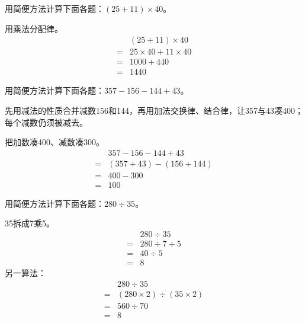 用简便方法计算下面各题：\((25+11)\times40\)。\par
\begin{BookAnswer}
用乘法分配律。\[\begin{aligned} &(25+11)\times40\\={}&25\times40+11\times40\\={}&1000+440\\={}&1440\end{aligned}\]
\end{BookAnswer}

用简便方法计算下面各题：\(357-156-144+43\)。\par
\begin{BookAnswer}
先用减法的性质合并减数156和144，再用加法交换律、结合律，让357与43凑400；每个减数仍须被减去。\par 把加数凑400、减数凑300。\[\begin{aligned} &357-156-144+43\\={}&(357+43)-(156+144)\\={}&400-300\\={}&100\end{aligned}\]
\end{BookAnswer}

用简便方法计算下面各题：\(280\div35\)。\par
\begin{BookAnswer}
35拆成7乘5。\[\begin{aligned} &280\div35\\={}&280\div7\div5\\={}&40\div5\\={}&8\end{aligned}\]另一算法：\[\begin{aligned} &280\div35\\={}&(280\times2)\div(35\times2)\\={}&560\div70\\={}&8\end{aligned}\]
\end{BookAnswer}

